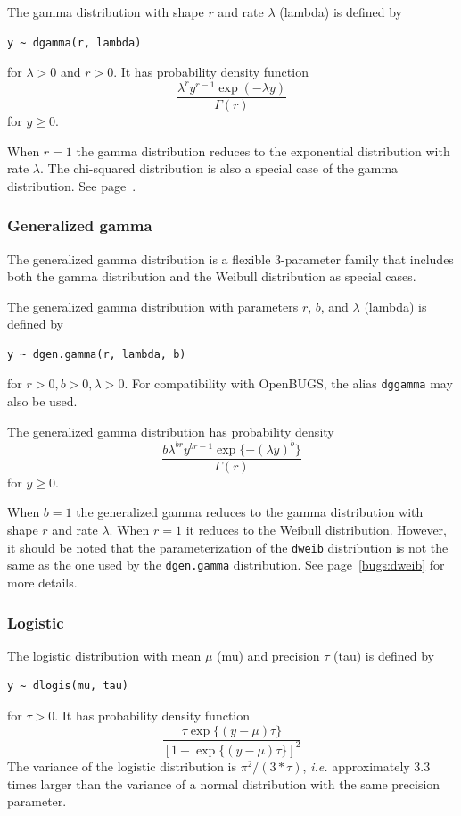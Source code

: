 \documentclass[11pt, a4paper, titlepage]{report}
\begin{document}
The gamma distribution with shape $r$ and rate $\lambda$ (lambda) is
defined by
\begin{verbatim}
y ~ dgamma(r, lambda)
\end{verbatim}
for $\lambda > 0$ and $r > 0$. It has probability density function
\[
\frac{\textstyle \lambda^r y^{r - 1} \exp(-\lambda y)}
     {\textstyle \Gamma(r)}
\]
for $y \geq 0$.

When $r=1$ the gamma distribution reduces to the exponential distribution
with rate $\lambda$. The chi-squared distribution is also a special case
of the gamma distribution. See page~\pageref{bugs:dchisqr}.

\subsubsection{Generalized gamma}      
\label{bugs:dgen.gamma}

The generalized gamma distribution is a flexible 3-parameter family
that includes both the gamma distribution and the Weibull distribution
as special cases.

The generalized gamma distribution with parameters $r$, $b$, and
$\lambda$ (lambda) is defined by
\begin{verbatim}
y ~ dgen.gamma(r, lambda, b)
\end{verbatim}
for $r > 0, b > 0, \lambda > 0$. For compatibility with OpenBUGS, the
alias \texttt{dggamma} may also be used.

The generalized gamma distribution has probability density
\[
\frac{\textstyle b \lambda^{b r} y^{b r - 1}  \exp\{-(\lambda y)^{b}\}}
     {\textstyle \Gamma(r)}
\]
for $y \geq 0$.

When $b=1$ the generalized gamma reduces to the gamma distribution
with shape $r$ and rate $\lambda$. When $r=1$ it reduces to the
Weibull distribution. However, it should be noted that the
parameterization of the \texttt{dweib} distribution is not the same as
the one used by the \texttt{dgen.gamma} distribution. See
page~\ref{bugs:dweib} for more details.

\subsubsection{Logistic}
\label{bugs:dlogis}

The logistic distribution with mean $\mu$ (mu) and precision $\tau$ (tau) is
defined by
\begin{verbatim}
y ~ dlogis(mu, tau)
\end{verbatim}
for $\tau > 0$. It has probability density function
\[
\frac{\textstyle \tau \exp\{(y - \mu) \tau\}}
     {\textstyle  \left[1 + \exp\{(y - \mu) \tau\}\right]^2}
\]   
The variance of the logistic distribution is $\pi^2/(3*\tau)$, {\em
  i.e.} approximately 3.3 times larger than the variance of a normal
distribution with the same precision parameter.
\end{document}
